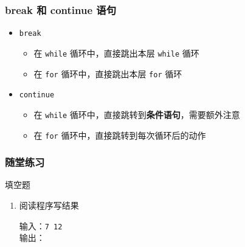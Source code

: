 \begin{frame}[fragile]
    \frametitle{break 和 continue 语句}

    \begin{itemize}
        \item<1-> \lstinline|break|

            \begin{itemize}
                \item 在 \lstinline|while| 循环中，直接跳出本层 \lstinline|while| 循环
                \item 在 \lstinline|for| 循环中，直接跳出本层 \lstinline|for| 循环
            \end{itemize}

        \item<2-> \lstinline|continue|

            \begin{itemize}
                \item 在 \lstinline|while| 循环中，直接跳转到\textbf{条件语句}，需要额外注意
                \item 在 \lstinline|for| 循环中，直接跳转到每次循环后的动作
            \end{itemize}

    \end{itemize}
\end{frame}

\begin{frame}[fragile]
    \frametitle{随堂练习}

    \begin{exampleblock}{填空题}

        \begin{enumerate}
            \item 阅读程序写结果
                

                \small{输入：}\lstinline|7 12|\\
                \small{输出：}
        \end{enumerate}

    \end{exampleblock}
\end{frame}



